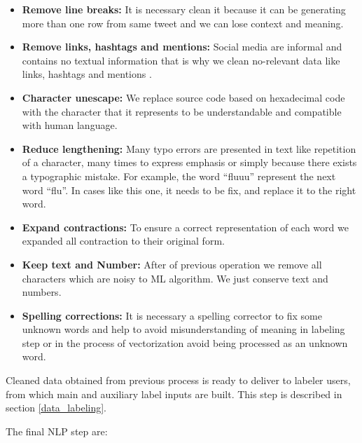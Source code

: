 \documentclass[12pt]{report}
\begin{document}
\begin{itemize}[nolistsep]
	\item \textbf{Remove line breaks:} It is necessary clean it because it can be generating more than one row from same tweet and we can lose context and meaning.
	
	\item \textbf{Remove links, hashtags and mentions:} Social media are informal and contains no textual information that is why we clean no-relevant data like links, hashtags and mentions \cite{Dai2017}.
	
	\item \textbf{Character unescape:} We replace source code based on hexadecimal code with the character that it represents to be understandable and compatible with human language.
	
	\item \textbf{Reduce lengthening:} Many typo errors are presented in text like repetition of a character, many times to express emphasis or simply because there exists a typographic mistake. For example, the word ``fluuu'' represent the next word ``flu''. In cases like this one,  it needs to be fix, and replace it to the right word.
	
	\item \textbf{Expand contractions:} To ensure a correct representation of each word we expanded all contraction to their original form.
	
	\item \textbf{Keep text and Number:} After of previous operation we remove all characters which are noisy to \ac{ML} algorithm. We just conserve text and numbers.
	
	\item \textbf{Spelling corrections:} It is necessary a spelling corrector to fix some unknown words and help to avoid misunderstanding of meaning in labeling step or in the process of vectorization avoid being processed as an unknown word.\\
	
\end{itemize}

Cleaned data obtained  from previous process is ready to deliver to labeler users, from which main and auxiliary label inputs are built. This step is described in section \ref{data_labeling}.

The final \ac{NLP} step are: 
\end{document}
